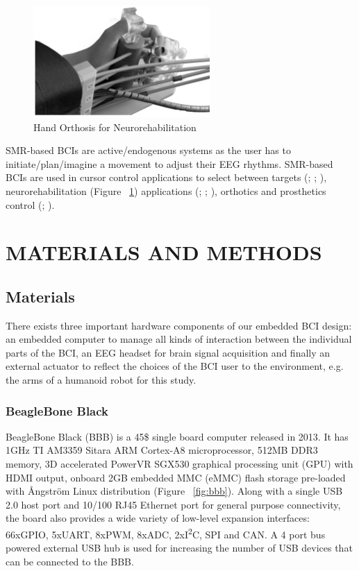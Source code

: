 \documentclass[12pt]{article}
\newcommand\mysection[1]{\vspace*{-0.35cm}\section{#1}\vspace*{6pt}\thispagestyle{empty}}
\newcommand\mysubsection[1]{\subsection{#1}}
\newcommand\mysubsubsection[1]{\subsubsection{#1}}
\numberwithin{equation}{section}
\numberwithin{figure}{section}
\numberwithin{table}{section}
\begin{document}
\par{
    \begin{figure}[ht]
        \centering
        \includegraphics[width=0.6\textwidth]{images/bci_hand_rehab}
        \caption[Hand Orthosis for Neurorehabilitation]{Hand Orthosis for Neurorehabilitation \citep{ramos-murguialday_proprioceptive_2012}}
        \label{fig:motor_orthosis}
    \end{figure}
    SMR-based BCIs are active/endogenous systems as the user has to initiate/plan/imagine
    a movement to adjust their EEG rhythms. SMR-based BCIs are used in cursor control
    applications to select between targets
    (\citealp{wolpaw_eeg-based_1991}; \citealp{wolpaw_wadsworth_2003}; \citealp{vaughan_wadsworth_2006}),
    neurorehabilitation (Figure ~\ref{fig:motor_orthosis}) applications (\citealp{prasad_using_2009}; \citealp{ramos-murguialday_proprioceptive_2012};
    \citealp{ortner_human-computer_2013}), orthotics and prosthetics control (\citealp{guger_prosthetic_1999}; \citealp{pfurtscheller_motor_2001}).
}



\clearpage
\vspace*{-0.35cm}
\mysection{MATERIALS AND METHODS}

\mysubsection{Materials}
\par{
    There exists three important hardware components of our embedded BCI
    design: an embedded computer to manage all kinds of interaction between the
    individual parts of the BCI, an EEG headset for brain signal acquisition and
    finally an external actuator to reflect the choices of the BCI user to the
    environment, e.g. the arms of a humanoid robot for this study.
}
\mysubsubsection{BeagleBone Black}

\par{
    BeagleBone Black (BBB) is a 45\$ single board computer released in 2013. It has 1GHz TI AM3359 Sitara ARM Cortex-A8 microprocessor,
    512MB DDR3 memory, 3D accelerated PowerVR SGX530 graphical processing unit (GPU) with HDMI output, onboard 2GB embedded MMC (eMMC)
    flash storage pre-loaded with Ångström Linux distribution (Figure ~\ref{fig:bbb}). Along with a single USB 2.0 host port and 10/100 RJ45 Ethernet port for
    general purpose connectivity, the board also provides a wide variety of low-level expansion interfaces:
    66xGPIO, 5xUART, 8xPWM, 8xADC, 2xI\textsuperscript{2}C, SPI and CAN. A 4 port bus powered external USB hub is used for
    increasing the number of USB devices that can be connected to the BBB.
}
\end{document}
